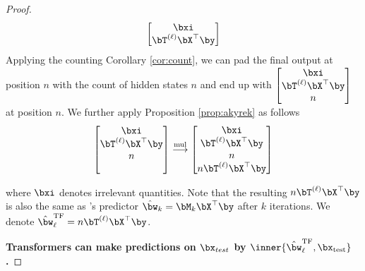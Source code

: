 \begin{proof}
\begin{equation}
\begin{bmatrix}
        \bxi \\ \bT^{(\ell)} \bX^\top \by 
    \end{bmatrix}
\end{equation}
Applying the counting Corollary \ref{cor:count}, we can pad the final output at position $n$ with the count of hidden states $n$ and end up with $\begin{bmatrix}
    \bxi  \\ \bT^{(\ell)} \bX^\top \by  \\ n
\end{bmatrix}$ at position $n$. We further apply Proposition \ref{prop:akyrek} as follows
\begin{equation}
    \begin{bmatrix}
    \bxi  \\ \bT^{(\ell)} \bX^\top \by  \\ n \\ ~
\end{bmatrix} \overset{\mathrm{mul}}{\longrightarrow} \begin{bmatrix}
    \bxi  \\ \bT^{(\ell)} \bX^\top \by  \\ n \\ n \bT^{(\ell)} \bX^\top \by
\end{bmatrix}
\end{equation} 

where $\bxi$ denotes irrelevant quantities. Note that the resulting $n\bT^{(\ell)} \bX^\top \by $ is also the same as \newton's predictor $\hat{\bw}_k = \bM_k \bX^\top \by$ after $k$ iterations. We denote $\hat{\bw}_\ell^\mathrm{TF} = n\bT^{(\ell)} \bX^\top \by$.

\textbf{Transformers can make predictions on $\bx_{test}$ by $\inner{\hat{\bw}_\ell^\mathrm{TF}, \bx_\mathrm{test}}$.}


\end{proof}
